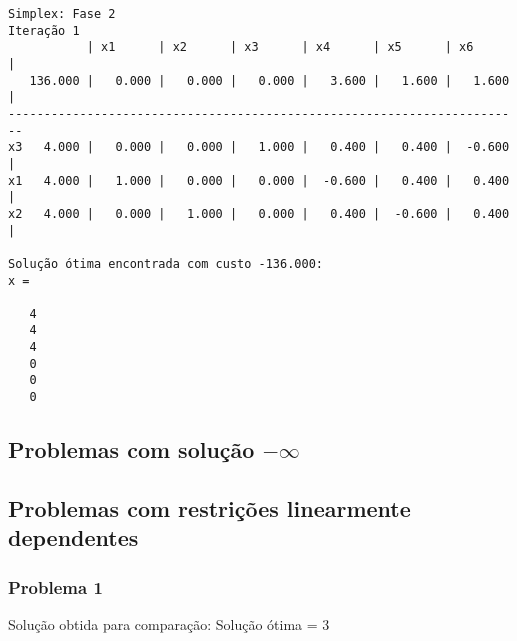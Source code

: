 \documentclass[brazil,times]{abnt}
\begin{document}
{\begin{verbatim}
Simplex: Fase 2
Iteração 1
           | x1      | x2      | x3      | x4      | x5      | x6      |
   136.000 |   0.000 |   0.000 |   0.000 |   3.600 |   1.600 |   1.600 |
------------------------------------------------------------------------
x3   4.000 |   0.000 |   0.000 |   1.000 |   0.400 |   0.400 |  -0.600 |
x1   4.000 |   1.000 |   0.000 |   0.000 |  -0.600 |   0.400 |   0.400 |
x2   4.000 |   0.000 |   1.000 |   0.000 |   0.400 |  -0.600 |   0.400 |

Solução ótima encontrada com custo -136.000:
x =

   4
   4
   4
   0
   0
   0
\end{verbatim} }


\subsection*{Problemas com solução $-\infty$}

\subsection*{Problemas com restrições linearmente dependentes}
\subsubsection*{Problema 1}
Solução obtida para comparação: Solução ótima = 3
\end{document}
